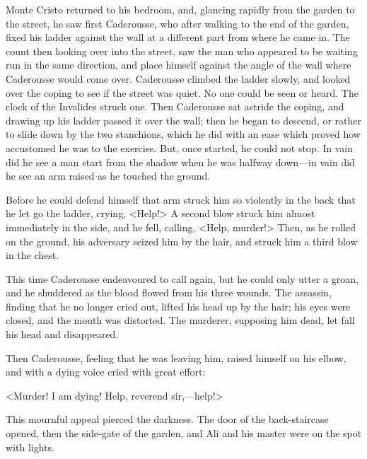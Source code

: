  Monte Cristo returned to his bedroom, and, glancing rapidly from the garden to the street, he saw first Caderousse, who after walking to the end of the garden, fixed his ladder against the wall at a different part from where he came in. The count then looking over into the street, saw the man who appeared to be waiting run in the same direction, and place himself against the angle of the wall where Caderousse would come over. Caderousse climbed the ladder slowly, and looked over the coping to see if the street was quiet. No one could be seen or heard. The clock of the Invalides struck one. Then Caderousse sat astride the coping, and drawing up his ladder passed it over the wall; then he began to descend, or rather to slide down by the two stanchions, which he did with an ease which proved how accustomed he was to the exercise. But, once started, he could not stop. In vain did he see a man start from the shadow when he was halfway down—in vain did he see an arm raised as he touched the ground. 

 Before he could defend himself that arm struck him so violently in the back that he let go the ladder, crying, <Help!> A second blow struck him almost immediately in the side, and he fell, calling, <Help, murder!> Then, as he rolled on the ground, his adversary seized him by the hair, and struck him a third blow in the chest. 

 This time Caderousse endeavoured to call again, but he could only utter a groan, and he shuddered as the blood flowed from his three wounds. The assassin, finding that he no longer cried out, lifted his head up by the hair; his eyes were closed, and the mouth was distorted. The murderer, supposing him dead, let fall his head and disappeared. 

 Then Caderousse, feeling that he was leaving him, raised himself on his elbow, and with a dying voice cried with great effort: 

 <Murder! I am dying! Help, reverend sir,—help!> 

 This mournful appeal pierced the darkness. The door of the back-staircase opened, then the side-gate of the garden, and Ali and his master were on the spot with lights. 